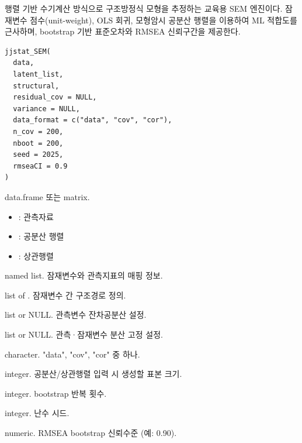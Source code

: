 \documentclass[a4paper]{book}
\begin{document}
%
\begin{Description}
행렬 기반 수기계산 방식으로 구조방정식 모형을 추정하는
교육용 SEM 엔진이다. 잠재변수 점수(unit-weight),
OLS 회귀, 모형암시 공분산 행렬을 이용하여
ML 적합도를 근사하며, bootstrap 기반 표준오차와
RMSEA 신뢰구간을 제공한다.
\end{Description}
%
\begin{Usage}
\begin{verbatim}
jjstat_SEM(
  data,
  latent_list,
  structural,
  residual_cov = NULL,
  variance = NULL,
  data_format = c("data", "cov", "cor"),
  n_cov = 200,
  nboot = 200,
  seed = 2025,
  rmseaCI = 0.9
)
\end{verbatim}
\end{Usage}
%
\begin{Arguments}
\begin{ldescription}
\item[\code{data}] data.frame 또는 matrix.
\begin{itemize}

\item{} : 관측자료
\item{} : 공분산 행렬
\item{} : 상관행렬

\end{itemize}


\item[\code{latent\_list}] named list.
잠재변수와 관측지표의 매핑 정보.

\item[\code{structural}] list of .
잠재변수 간 구조경로 정의.

\item[\code{residual\_cov}] list or NULL.
관측변수 잔차공분산 설정.

\item[\code{variance}] list or NULL.
관측·잠재변수 분산 고정 설정.

\item[\code{data\_format}] character.
"data", "cov", "cor" 중 하나.

\item[\code{n\_cov}] integer.
공분산/상관행렬 입력 시 생성할 표본 크기.

\item[\code{nboot}] integer.
bootstrap 반복 횟수.

\item[\code{seed}] integer.
난수 시드.

\item[\code{rmseaCI}] numeric.
RMSEA bootstrap 신뢰수준 (예: 0.90).
\end{ldescription}
\end{Arguments}
\end{document}
